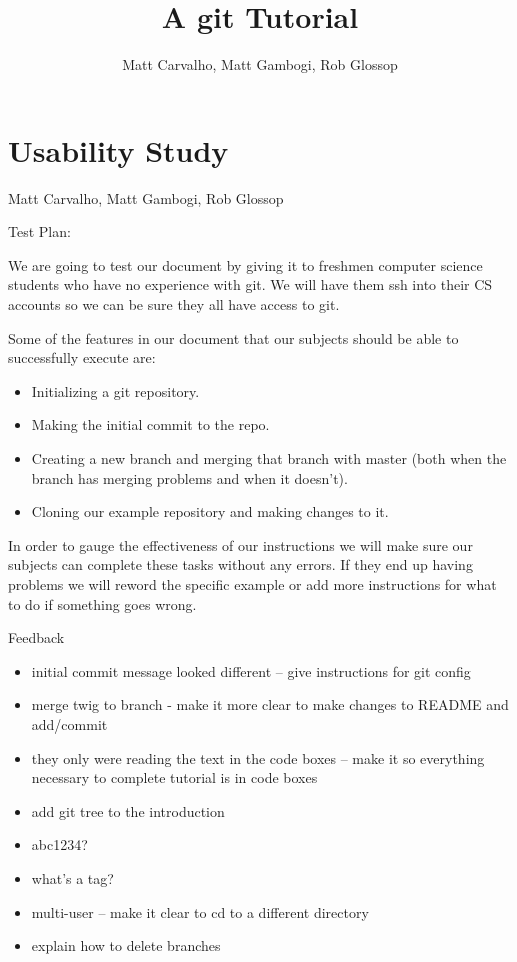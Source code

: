 \documentclass[11pt]{report}
\title{A git Tutorial}
\author{Matt Carvalho, Matt Gambogi, Rob Glossop}
\begin{document}
\section*{Usability Study}
Matt Carvalho, Matt Gambogi, Rob Glossop


Test Plan:

We are going to test our document by giving it to freshmen computer
science students who have no experience with git. We will have them
ssh into their CS accounts so we can be sure they all have access to
git.
        
Some of the features in our document that our subjects should be able
to successfully execute are:

\begin{itemize}
\item Initializing a git repository.

\item Making the initial commit to the repo.

\item Creating a new branch and merging that branch with master (both when
  the branch has merging problems and when it doesn’t).
  
\item Cloning our example repository and making changes to it.
\end{itemize}
In order to gauge the effectiveness of our instructions we will make
sure our subjects can complete these tasks without any errors. If they
end up having problems we will reword the specific example or add more
instructions for what to do if something goes wrong.


Feedback
\begin{itemize}
\item initial commit message looked different -- give instructions for git
config

\item merge twig to branch - make it more clear to make changes to README
and add/commit

\item they only were reading the text in the code boxes -- make it so
  everything necessary to complete tutorial is in code boxes
  
\item add git tree to the introduction

\item abc1234?

\item what’s a tag?

\item multi-user -- make it clear to cd to a different directory

\item explain how to delete branches
\end{itemize}
\end{document}
